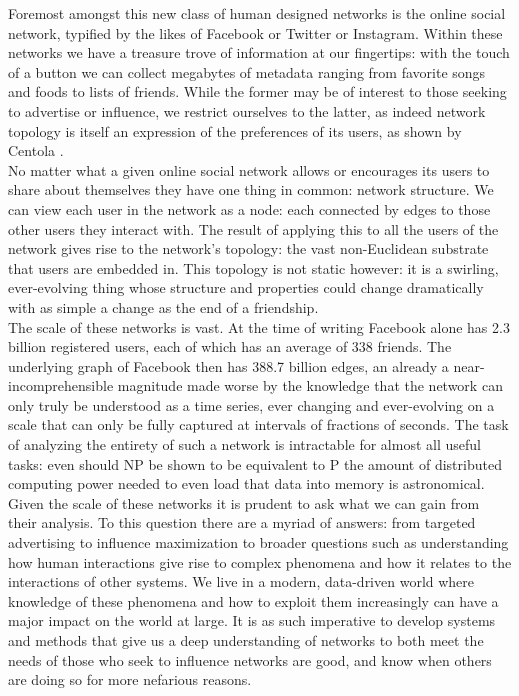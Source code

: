 \documentclass[12pt,twoside]{report}
\begin{document}
Foremost amongst this new class of human designed networks is the online social network, typified by the likes of Facebook or Twitter or Instagram. Within these networks we have a treasure trove of information at our fingertips: with the touch of a button we can collect megabytes of metadata ranging from favorite songs and foods to lists of friends. While the former may be of interest to those seeking to advertise or influence, we restrict ourselves to the latter, as indeed network topology is itself an expression of the preferences of its users, as shown by Centola \cite{centola2015social}.\\

No matter what a given online social network allows or encourages its users to share about themselves they have one thing in common: network structure. We can view each user in the network as a node: each connected by edges to those other users they interact with. The result of applying this to all the users of the network gives rise to the network's topology: the vast non-Euclidean substrate that users are embedded in. This topology is not static however: it is a swirling, ever-evolving thing whose structure and properties could change dramatically with as simple a change as the end of a friendship. \\

The scale of these networks is vast. At the time of writing Facebook alone has 2.3 billion registered users, each of which has an average of 338 friends. The underlying graph of Facebook then has 388.7 billion edges, an already a near-incomprehensible magnitude made worse by the knowledge that the network can only truly be understood as a time series, ever changing and ever-evolving on a scale that can only be fully captured at intervals of fractions of seconds. The task of analyzing the entirety of such a network is intractable for almost all useful tasks: even should NP be shown to be equivalent to P the amount of distributed computing power needed to even load that data into memory is astronomical. \\

Given the scale of these networks it is prudent to ask what we can gain from their analysis. To this question there are a myriad of answers: from targeted advertising to influence maximization to broader questions such as understanding how human interactions give rise to complex phenomena and how it relates to the interactions of other systems. We live in a modern, data-driven world where knowledge of these phenomena and how to exploit them increasingly can have a major impact on the world at large. It is as such imperative to develop systems and methods that give us a deep understanding of networks to both meet the needs of those who seek to influence networks are good, and know when others are doing so for more nefarious reasons. \\
\end{document}
